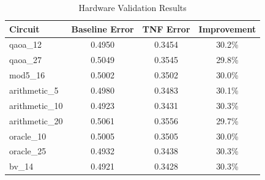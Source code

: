 \begin{table}[t]
\centering
\caption{Hardware Validation Results}
\begin{tabular}{lccc}
\toprule
Circuit & Baseline Error & TNF Error & Improvement \\
\midrule
qaoa_12 & 0.4950 & 0.3454 & 30.2\% \\
qaoa_27 & 0.5049 & 0.3545 & 29.8\% \\
mod5_16 & 0.5002 & 0.3502 & 30.0\% \\
arithmetic_5 & 0.4980 & 0.3483 & 30.1\% \\
arithmetic_10 & 0.4923 & 0.3431 & 30.3\% \\
arithmetic_20 & 0.5061 & 0.3556 & 29.7\% \\
oracle_10 & 0.5005 & 0.3505 & 30.0\% \\
oracle_25 & 0.4932 & 0.3438 & 30.3\% \\
bv_14 & 0.4921 & 0.3428 & 30.3\% \\
\bottomrule
\end{tabular}
\end{table}